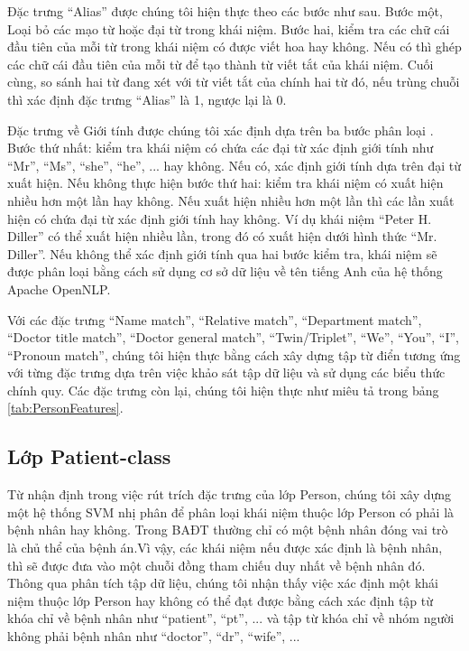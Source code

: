 Đặc trưng ``Alias'' được chúng tôi hiện thực theo các bước như sau. Bước một, Loại bỏ các mạo từ hoặc đại từ trong khái niệm. Bước hai, kiểm tra các chữ cái đầu tiên của mỗi từ trong khái niệm có được viết hoa hay không. Nếu có thì ghép các chữ cái đầu tiên của mỗi từ để tạo thành từ viết tắt của khái niệm. Cuối cùng, so sánh hai từ đang xét với từ viết tắt của chính hai từ đó, nếu trùng chuỗi thì xác định đặc trưng ``Alias'' là 1, ngược lại là 0.

Đặc trưng về Giới tính được chúng tôi xác định dựa trên ba bước phân loại \cite{WeeSoon2001}. Bước thứ nhất: kiểm tra khái niệm có chứa các đại từ xác định giới tính như ``Mr'', ``Ms'', ``she'', ``he'', ... hay không. Nếu có, xác định giới tính dựa trên đại từ xuất hiện. Nếu không thực hiện bước thứ hai: kiểm tra khái niệm có xuất hiện nhiều hơn một lần hay không. Nếu xuất hiện nhiều hơn một lần thì các lần xuất hiện có chứa đại từ xác định giới tính hay không. Ví dụ khái niệm ``Peter H. Diller'' có thể xuất hiện nhiều lần, trong đó có xuất hiện dưới hình thức ``Mr. Diller''. Nếu không thể xác định giới tính qua hai bước kiểm tra, khái niệm sẽ được phân loại bằng cách sử dụng cơ sở dữ liệu về tên tiếng Anh của hệ thống Apache OpenNLP.

Với các đặc trưng ``Name match'', ``Relative match'', ``Department match'', ``Doctor title match'', ``Doctor general match'', ``Twin/Triplet'', ``We'', ``You'', ``I'', ``Pronoun match'', chúng tôi hiện thực bằng cách xây dựng tập từ điển tương ứng với từng đặc trưng dựa trên việc khảo sát tập dữ liệu và sử dụng các biểu thức chính quy. Các đặc trưng còn lại, chúng tôi hiện thực như miêu tả trong bảng \ref{tab:PersonFeatures}.

\subsection*{Lớp Patient-class}
Từ nhận định trong việc rút trích đặc trưng của lớp Person, chúng tôi xây dựng một hệ thống SVM nhị phân để phân loại khái niệm thuộc lớp Person có phải là bệnh nhân hay không. Trong BAĐT thường chỉ có một bệnh nhân đóng vai trò là chủ thể của bệnh án.Vì vậy, các khái niệm nếu được xác định là bệnh nhân, thì sẽ được đưa vào một chuỗi đồng tham chiếu duy nhất về bệnh nhân đó. Thông qua phân tích tập dữ liệu, chúng tôi nhận thấy việc xác định một khái niệm thuộc lớp Person hay không có thể đạt được bằng cách xác định tập từ khóa chỉ về bệnh nhân như ``patient'', ``pt'', ... và tập từ khóa chỉ về nhóm người không phải bệnh nhân như ``doctor'', ``dr'', ``wife'', ...

